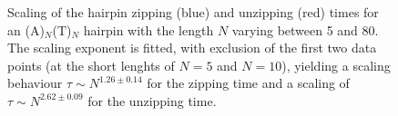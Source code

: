 \begin{figure}[htb]
       \begin{center}
               \scalebox{0.9}{
                        \nonstopmode
                        
                        \errorstopmode
                        \rule[-0.5cm]{0cm}{0cm}}
                \caption{Scaling of the hairpin zipping (blue) and unzipping (red) times for an (A)$_N$(T)$_N$ hairpin with the length $N$ varying between 5 and 80. The scaling exponent is fitted, with exclusion of the first two data points (at the short lenghts of $N = 5$ and $N = 10$), yielding a scaling behaviour $\tau \sim N^{1.26 \pm 0.14}$ for the zipping time and a scaling of $\tau \sim N^{2.62 \pm 0.09}$ for the unzipping time.}
                \label{hairpinScaling}
        \end{center}
\end{figure}

